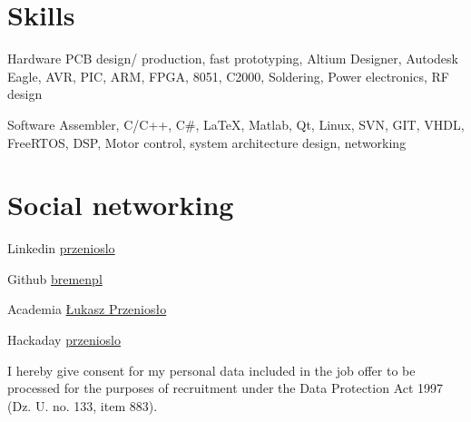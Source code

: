 \documentclass{tccv}
\begin{document}
\section{Skills}

\begin{factlist}

\item{Hardware}
     {PCB design/ production, fast prototyping, Altium Designer, Autodesk Eagle, AVR, PIC, ARM, FPGA, 8051, C2000, Soldering, Power electronics, RF design}

\item{Software}
     {Assembler, C/C++, C\#, \LaTeX, Matlab, Qt, Linux, SVN, GIT, VHDL, FreeRTOS, DSP, Motor control, system architecture design, networking}

\end{factlist}

\section{Social networking}

\begin{factlist}

\item{Linkedin}
     {\href{http://pl.linkedin.com/in/przenioslo}{przenioslo}}
     
\item{Github}
     {\href{http://github.com/bremenpl}{bremenpl}}
     
\item{Academia}
     {\href{https://zut.academia.edu/\%C5\%81ukaszPrzenios\%C5\%82o}{Łukasz Przeniosło}}
     
\item{Hackaday}
     {\href{http://hackaday.io/przenioslo}{przenioslo}}  

\end{factlist} 

\vspace*{\fill} %

{\scriptsize I hereby give consent for my personal data included in the job offer to be processed for the purposes of recruitment under the Data Protection Act 1997 (Dz. U. no. 133, item 883).}
\end{document}
